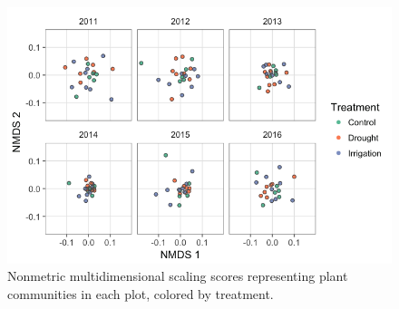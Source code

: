 \documentclass[fleqn,10pt,lineno]{wlpeerj} %
\begin{document}
\newpage{}

\begin{figure}[!ht]
  \centering
      \includegraphics[width=5in]{../figures/sppcomp_bray_all.png}
  \caption{Nonmetric multidimensional scaling scores representing plant communities in each plot, colored by treatment.}
\end{figure}

\newpage{}



\end{document}
